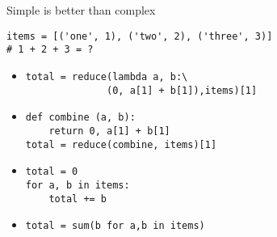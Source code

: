 \documentclass[hyperref={pdftex,unicode}]{beamer}
\begin{document}
\begin{frame}[fragile]{Simple is better than complex}
  \begin{lstlisting}
items = [('one', 1), ('two', 2), ('three', 3)]
# 1 + 2 + 3 = ?
\end{lstlisting}

\begin{itemize}
\item
  \begin{lstlisting}[numbers=right]
total = reduce(lambda a, b:\
              (0, a[1] + b[1]),items)[1]
\end{lstlisting}

\item
\begin{lstlisting}[numbers=right]
def combine (a, b):
    return 0, a[1] + b[1]
total = reduce(combine, items)[1]
\end{lstlisting}

\item
\begin{lstlisting}[numbers=right]
total = 0
for a, b in items:
    total += b
\end{lstlisting}

\item
\begin{lstlisting}[numbers=right]
total = sum(b for a,b in items)
\end{lstlisting}
\end{itemize}
\end{frame}


\end{document}
